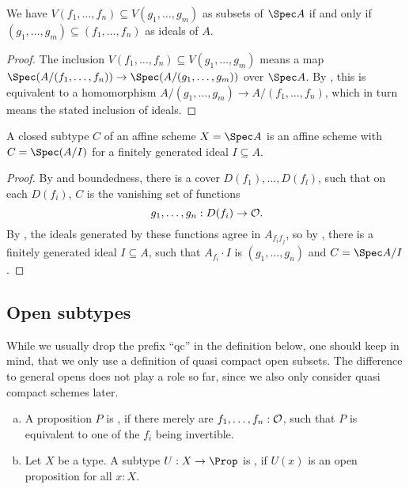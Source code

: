 \begin{lemma}%
  \label{ideals-embed-into-closed-subsets}
  We have $V(f_1, \dots, f_n) \subseteq V(g_1, \dots, g_m)$
  as subsets of $\Spec A$
  if and only if
  $(g_1, \dots, g_m) \subseteq (f_1, \dots, f_n)$
  as ideals of $A$.
\end{lemma}

\begin{proof}
  The inclusion $V(f_1, \dots, f_n) \subseteq V(g_1, \dots, g_m)$
  means a map $\Spec (A/(f_1, \dots, f_n)) \to \Spec (A/(g_1, \dots, g_m))$
  over $\Spec A$.
  By , this is equivalent to
  a homomorphism $A/(g_1, \dots, g_m) \to A/(f_1, \dots, f_n)$,
  which in turn means the stated inclusion of ideals.
\end{proof}

\begin{lemma}%
  \label{closed-subtype-affine}
  A closed subtype $C$ of an affine scheme $X=\Spec A$ is an affine scheme
  with $C=\Spec (A/I)$ for a finitely generated ideal $I\subseteq A$.
\end{lemma}

\begin{proof}
  By  and boundedness,
  there is a cover $D(f_1),\dots,D(f_l)$, such that
  on each $D(f_i)$, $C$ is the vanishing set of functions
  \[ g_1,\dots,g_n:D(f_i)\to \A\rlap{.} \]
  By ,
  the ideals generated by these functions
  agree in $A_{f_i f_j}$,
  so by ,
  there is a finitely generated ideal $I\subseteq A$,
  such that $A_{f_i}\cdot I$ is $(g_1,\dots,g_n)$
  and $C=\Spec A/I$.
\end{proof}

\subsection{Open subtypes}

While we usually drop the prefix ``qc'' in the definition below,
one should keep in mind, that we only use a definition of quasi compact open subsets.
The difference to general opens does not play a role so far,
since we also only consider quasi compact schemes later.

\begin{definition}%
  \label{qc-open}
  \begin{enumerate}[(a)]
  \item A proposition $P$ is , if there merely are $f_1,\dots,f_n:\mathcal O$,
    such that $P$ is equivalent to one of the $f_i$ being invertible.
  \item Let $X$ be a type.
    A subtype $U:X\to\Prop$ is , if $U(x)$ is an open proposition for all $x:X$.
  \end{enumerate}
\end{definition}

